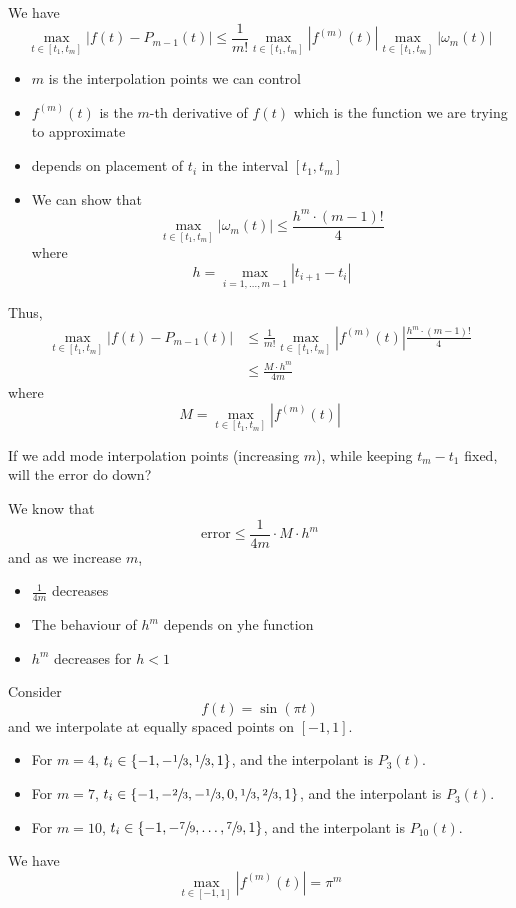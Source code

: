 We have \[
    \max_{t \in [t_1, t_m]} | f(t) - P_{m-1}(t) | \leq \frac{1}{m!} \max_{t \in [t_1, t_m]} | f^{(m)}(t) | \max_{t \in [t_1, t_m]} | \omega_m(t) |
\]
\begin{itemize}
    \item \( m \) is the interpolation points we can control
    \item \( f^{(m)}(t) \) is the \( m \)-th derivative of \( f(t) \) which is the function we are trying to approximate
    \item depends on placement of \( t_i \) in the interval \([t_1, t_m]\)
    \item We can show that \[
              \max_{t \in [t_1, t_m]} | \omega_m(t) | \leq \frac{h^m \cdot (m - 1)!}{4}
          \] where \[
              h = \max_{i = 1, \dots, m-1} | t_{i+1} - t_i |
          \]
\end{itemize}

Thus, \begin{align*}
    \max_{t \in [t_1, t_m]} | f(t) - P_{m-1}(t) |
     & \leq \frac{1}{m!} \max_{t \in [t_1, t_m]} | f^{(m)}(t) | \frac{h^m \cdot (m - 1)!}{4}
    \\
     & \leq \frac{M \cdot h^m}{4m}
\end{align*} where \[
    M = \max_{t \in [t_1, t_m]} | f^{(m)}(t) |
\]

If we add mode interpolation points (increasing \( m \)), while keeping \( t_m - t_1 \) fixed, will the error do down?

We know that \[
    \text{error} \leq \frac{1}{4m} \cdot M \cdot h^m
\] and as we increase \( m \),
\begin{itemize}
    \item \( \frac{1}{4m} \) decreases
    \item The behaviour of \( h^m \) depends on yhe function
    \item \( h^m \) decreases for \( h < 1 \)
\end{itemize}

\begin{example}
    Consider \[
        f(t) = \sin(\pi t)
    \] and we interpolate at equally spaced points on \( [-1, 1] \).

    \begin{itemize}
        \item For \( m = 4 \), \( t_i \in \{ -1, -\sfrac{1}{3}, \sfrac{1}{3}, 1 \} \), and the interpolant is \( P_3(t) \).
        \item For \( m = 7 \), \( t_i \in \{ -1, -\sfrac{2}{3}, -\sfrac{1}{3}, 0, \sfrac{1}{3}, \sfrac{2}{3}, 1 \} \), and the interpolant is \( P_3(t) \).
        \item For \( m = 10 \), \( t_i \in \{ -1, -\sfrac{7}{9}, \dots, \sfrac{7}{9}, 1 \} \), and the interpolant is \( P_10(t) \).
    \end{itemize}


    We have \[
        \max_{t \in [-1, 1]} | f^{(m)}(t) | = \pi^m
    \]
\end{example}

